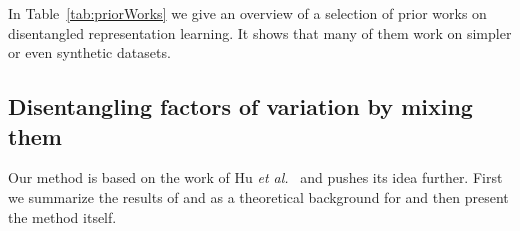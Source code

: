 \documentclass[a4paper,12pt]{report}
\begin{document}
\vspace{5mm}
In Table~\ref{tab:priorWorks} we give an overview of a selection of prior works on disentangled representation learning. It shows that many of them work on simpler or even synthetic datasets.
\begin{table} [ht!]
\centering
{}
\caption[Overview and characteristics of prior works.]{Overview and characteristics of prior works on disentangled representation learning. (LT) learning type, (us) unsupervised, (ss) semi-supervised, (sv) supervised.} \label{tab:priorWorks}
\end{table}


\subsection{Disentangling factors of variation by mixing them}
Our method is based on the work of Hu \textit{et al.}~\cite{DisentFacOfVarByMixTh} and pushes its idea further. First we summarize the results of \cite{ChallengInDisentIFoF} and \cite{UnderstDegenAndAmbInAT} as a theoretical background for \cite{DisentFacOfVarByMixTh} and then present the method itself. 
\end{document}
